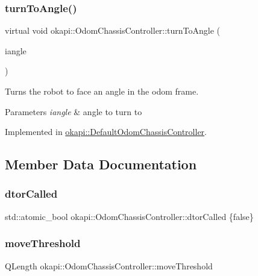 \subsubsection{\texorpdfstring{turnToAngle()}{turnToAngle()}}
{\footnotesize\ttfamily virtual void okapi\+::\+Odom\+Chassis\+Controller\+::turn\+To\+Angle (\begin{DoxyParamCaption}\item[{const Q\+Angle \&}]{iangle }\end{DoxyParamCaption})\hspace{0.3cm}{\ttfamily [pure virtual]}}

Turns the robot to face an angle in the odom frame.


\begin{DoxyParams}{Parameters}
{\em iangle} & angle to turn to \\
\hline
\end{DoxyParams}


Implemented in \mbox{\hyperlink{classokapi_1_1DefaultOdomChassisController_aaf6e4d74384b87510d35b639e45f9dc2}{okapi\+::\+Default\+Odom\+Chassis\+Controller}}.



\subsection{Member Data Documentation}
\mbox{\label{classokapi_1_1OdomChassisController_a2af36f833e8ac382c4386f729f904bae}} 
\subsubsection{\texorpdfstring{dtorCalled}{dtorCalled}}
{\footnotesize\ttfamily std\+::atomic\+\_\+bool okapi\+::\+Odom\+Chassis\+Controller\+::dtor\+Called \{false\}\hspace{0.3cm}{\ttfamily [protected]}}

\mbox{\label{classokapi_1_1OdomChassisController_a8fc34ac66535e1a2afaf8856f09a9f95}} 
\subsubsection{\texorpdfstring{moveThreshold}{moveThreshold}}
{\footnotesize\ttfamily Q\+Length okapi\+::\+Odom\+Chassis\+Controller\+::move\+Threshold\hspace{0.3cm}{\ttfamily [protected]}}

